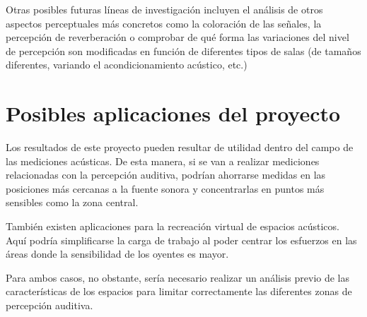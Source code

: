 \documentclass[11pt,a4paper,twoside]{book}
\begin{document}
        Otras posibles futuras líneas de investigación incluyen el análisis de otros aspectos perceptuales más concretos como la coloración de las señales, la percepción de reverberación o comprobar de qué forma las variaciones del nivel de percepción son modificadas en función de diferentes tipos de salas (de tamaños diferentes, variando el acondicionamiento acústico, etc.)
        
    \section{Posibles aplicaciones del proyecto}
        Los resultados de este proyecto pueden resultar de utilidad dentro del campo de las mediciones acústicas. De esta manera, si se van a realizar mediciones relacionadas con la percepción auditiva, podrían ahorrarse medidas en las posiciones más cercanas a la fuente sonora y concentrarlas en puntos más sensibles como la zona central.
        
        También existen aplicaciones para la recreación virtual de espacios acústicos. Aquí podría simplificarse la carga de trabajo al poder centrar los esfuerzos en las áreas donde la sensibilidad de los oyentes es mayor.
        
        Para ambos casos, no obstante, sería necesario realizar un análisis previo de las características de los espacios para limitar correctamente las diferentes zonas de percepción auditiva. 
    
\end{document}
